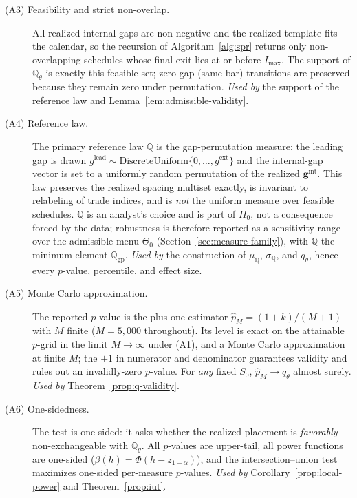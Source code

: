 \documentclass[risks,article,submit,pdftex,oneauthor]{Definitions/mdpi}
\begin{document}
\begin{Assumption}
\begin{description}
\item[(A3) Feasibility and strict non-overlap.] All realized internal gaps
are non-negative and the realized template fits the calendar, so the recursion
of Algorithm~\ref{alg:spr} returns only non-overlapping schedules whose final
exit lies at or before $I_{\max}$. The support of $\mathbb{Q}_\theta$ is exactly
this feasible set; zero-gap (same-bar) transitions are preserved because they
remain zero under permutation. \emph{Used by} the support of the reference law
and Lemma~\ref{lem:admissible-validity}.

\item[(A4) Reference law.] The primary reference law $\mathbb{Q}$ is the
gap-permutation measure: the leading gap is drawn
$g^{\mathrm{lead}}\sim\mathrm{DiscreteUniform}\{0,\dots,g^{\mathrm{ext}}\}$ and
the internal-gap vector is set to a uniformly random permutation of the
realized $\mathbf g^{\mathrm{int}}$. This law preserves the realized spacing
multiset exactly, is invariant to relabeling of trade indices, and is
\emph{not} the uniform measure over feasible schedules. $\mathbb{Q}$ is an
analyst's choice and is part of $H_0$, not a consequence forced by the data;
robustness is therefore reported as a sensitivity range over the admissible
menu $\Theta_0$ (Section~\ref{sec:measure-family}), with $\mathbb{Q}$ the
minimum element $\mathbb{Q}_{\mathrm{gp}}$. \emph{Used by} the construction of
$\mu_{\mathbb Q}$, $\sigma_{\mathbb Q}$, and $q_\theta$, hence every $p$-value,
percentile, and effect size.

\item[(A5) Monte Carlo approximation.] The reported $p$-value is the plus-one
estimator $\hat p_M=(1+k)/(M+1)$ with $M$ finite ($M=5{,}000$ throughout). Its
level is exact on the attainable $p$-grid in the limit $M\to\infty$ under (A1),
and a Monte Carlo approximation at finite $M$; the $+1$ in numerator and
denominator guarantees validity and rules out an invalidly-zero $p$-value. For
\emph{any} fixed $S_0$, $\hat p_M\to q_\theta$ almost surely. \emph{Used by}
Theorem~\ref{prop:q-validity}.

\item[(A6) One-sidedness.] The test is one-sided: it asks whether the realized
placement is \emph{favorably} non-exchangeable with $\mathbb{Q}_\theta$. All
$p$-values are upper-tail, all power functions are one-sided
($\beta(h)=\Phi(h-z_{1-\alpha})$), and the intersection--union test maximizes
one-sided per-measure $p$-values. \emph{Used by} Corollary~\ref{prop:local-power}
and Theorem~\ref{prop:iut}.


\end{description}
\end{Assumption}
\end{document}
